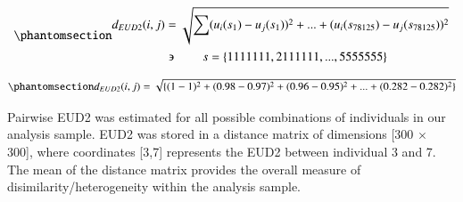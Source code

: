 \documentclass[
  number,
  preprint]{elsarticle}
\begin{document}
\begin{equation}\phantomsection\label{eq-EUD2}{
  \begin{aligned}
    d_{EUD2}(i,j) & =\sqrt{\sum_{}^{}(u_{i}(s_{1})-u_{j}(s_{1}))^{2}+ ... +(u_{i}(s_{78125})-u_{j}(s_{78125}))^{2}}\\
      & \backepsilon \quad \quad s = \{1111111, 2111111, ..., 5555555\}\\
  \end{aligned}
}\end{equation}

\begin{equation}\phantomsection\label{eq-pairwiseEUD2}{
d_{EUD2}(i,j) = \sqrt{\{(1-1)^2+(0.98-0.97)^2+(0.96-0.95)^2+ ... +(0.282-0.282)^2\}}
}\end{equation}

Pairwise EUD2 was estimated for all possible combinations of individuals
in our analysis sample. EUD2 was stored in a distance matrix of
dimensions {[}300 \(\times\) 300{]}, where coordinates {[}3,7{]}
represents the EUD2 between individual 3 and 7. The mean of the distance
matrix provides the overall measure of disimilarity/heterogeneity within
the analysis sample.


  
\end{document}
